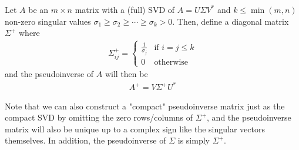 \begin{proper}
\label{proper:pinv}
Let $A$ be an $m \times n$ matrix with a (full) SVD of $A = U\Sigma V^*$ and $k \leq \min(m,n)$ non-zero singular values $\sigma_1 \geq \sigma_2 \geq \cdots \geq \sigma_k > 0$. Then, define a diagonal matrix $\Sigma^+$ where
\begin{align}
\Sigma^+_{ij} = \begin{cases}
\frac{1}{\sigma_j} & \text{if $i = j \leq k$} \\
0 & \text{otherwise}
\end{cases}
\end{align}
and the pseudoinverse of $A$ will then be 
\begin{align}
A^+ = V\Sigma^+ U^*    
\end{align}
\end{proper}
Note that we can also construct a "compact" pseudoinverse matrix just as the compact SVD by omitting the zero rows/columns of $\Sigma^+$, and the pseudoinverse matrix will also be unique up to a complex sign like the singular vectors themselves. In addition, the pseudoinverse of $\Sigma$ is simply $\Sigma^+$.

